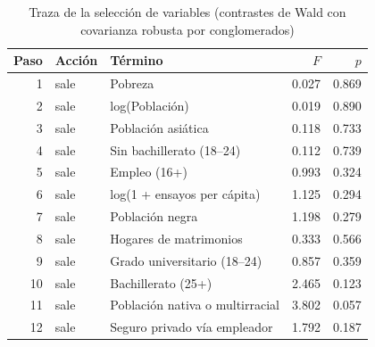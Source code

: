\begin{table}[htbp]
\centering
\small
\caption{Traza de la selección de variables (contrastes de Wald con covarianza robusta por conglomerados)}\label{tab:seleccion}
\begin{tabularx}{\linewidth}{r l >{\raggedright\arraybackslash}X r r}
\toprule
Paso & Acción & Término & $F$ & $p$ \\
\midrule
1 & sale & Pobreza & \num{0.027} & \num{0.869} \\
2 & sale & log(Población) & \num{0.019} & \num{0.890} \\
3 & sale & Población asiática & \num{0.118} & \num{0.733} \\
4 & sale & Sin bachillerato (18–24) & \num{0.112} & \num{0.739} \\
5 & sale & Empleo (16+) & \num{0.993} & \num{0.324} \\
6 & sale & log(1 + ensayos per cápita) & \num{1.125} & \num{0.294} \\
7 & sale & Población negra & \num{1.198} & \num{0.279} \\
8 & sale & Hogares de matrimonios & \num{0.333} & \num{0.566} \\
9 & sale & Grado universitario (18–24) & \num{0.857} & \num{0.359} \\
10 & sale & Bachillerato (25+) & \num{2.465} & \num{0.123} \\
11 & sale & Población nativa o multirracial & \num{3.802} & \num{0.057} \\
12 & sale & Seguro privado vía empleador & \num{1.792} & \num{0.187} \\
\bottomrule
\end{tabularx}

\end{table}
